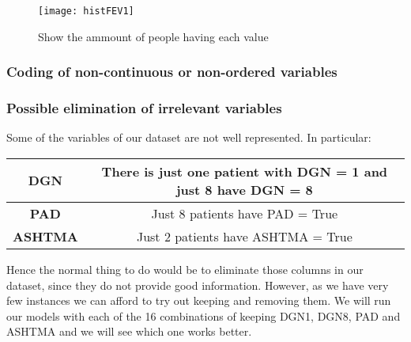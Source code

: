 

\begin{figure}[bh]
\centering
\texttt{[image: histFEV1]}
\label{fig:histFEV1}
\caption{Show the ammount of people having each value}
\end{figure}
\subsubsection{Coding of non-continuous or non-ordered variables}
\subsubsection{Possible elimination of irrelevant variables}

Some of the variables of our dataset are not well represented. In particular:

\begin{center}
\begin{tabular}{|c|c|}
  \hline
  \textbf{DGN} & There is just one patient with DGN = 1 and just 8 have DGN = 8 \\
  \hline
  \textbf{PAD} & Just 8 patients have PAD = True \\
  \hline
  \textbf{ASHTMA} & Just 2 patients have ASHTMA = True \\
  \hline
\end{tabular}
\end{center}

Hence the normal thing to do would be to eliminate those columns in our dataset,
since they do not provide good information. However, as we have very few instances
we can afford to try out keeping and removing them. We will run our models with
each of the 16 combinations of keeping DGN1, DGN8, PAD and ASHTMA and we will
see which one works better.


